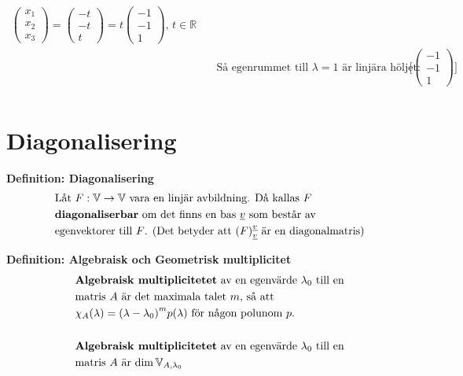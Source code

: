 \begin{align*}
  \begin{pmatrix} x_1 \\ x_2 \\ x_3 \end{pmatrix} =
  \begin{pmatrix} -t \\ -t \\ t \end{pmatrix} =
  t\begin{pmatrix} -1 \\ -1 \\ 1 \end{pmatrix}, \, t\in\mathbb{R} \\
  &\quad \text{Så egenrummet till $\lambda=1$ är linjära höljet: }
  \Big[ \begin{pmatrix} -1 \\ -1 \\ 1 \end{pmatrix} \Big]  \\
\end{align*}


\newpage

\section{Diagonalisering}
\textbf{Definition: Diagonalisering}
\begin{align*}
  &\quad  \text{Låt $F:\mathbb{V}\to\mathbb{V}$ vara en linjär avbildning. Då kallas $F$} \\
  &\quad  \text{\textbf{diagonaliserbar} om det finns en bas $\underline{v}$ som består av} \\
  &\quad  \text{egenvektorer till $F$. (Det betyder att ${(F)}^{\underline{v}}_{\underline{v}}$
    är en diagonalmatris)}  \\
\end{align*}

\textbf{Definition: Algebraisk och Geometrisk multiplicitet}
\begin{align*}
  &\quad  \text{\textbf{Algebraisk multiplicitetet} av en egenvärde $\lambda_0$ till en} \\
  &\quad  \text{matris $A$ är det maximala talet $m$, så att}  \\
  &\quad  \chi_A(\lambda) = {(\lambda-\lambda_0)}^m p(\lambda) \text{ för någon polunom $p$.} \\
  &\quad  \\
  &\quad  \text{\textbf{Algebraisk multiplicitetet} av en egenvärde $\lambda_0$ till en} \\
  &\quad  \text{matris $A$ är $\dim{\mathbb{V}_{A,\lambda_0}}$} \\
\end{align*}

